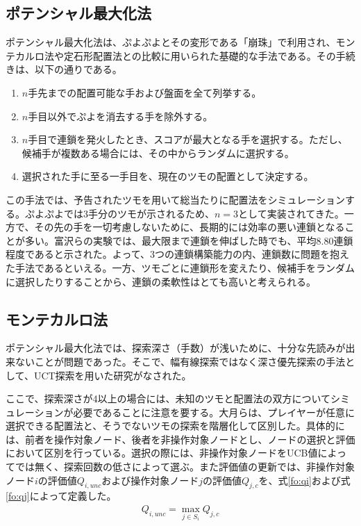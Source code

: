 \documentclass[12pt]{jsarticle}
\begin{document}
\subsection{ポテンシャル最大化法}
ポテンシャル最大化法は、ぷよぷよとその変形である「崩珠」で利用され、モンテカルロ法や定石形配置法との比較に用いられた基礎的な手法である\cite{puyo_monte, puyo_temp}。その手続きは、以下の通りである。
\begin{enumerate}
\item $n$手先までの配置可能な手および盤面を全て列挙する。
\item $n$手目以外でぷよを消去する手を除外する。
\item $n$手目で連鎖を発火したとき、スコアが最大となる手を選択する。ただし、候補手が複数ある場合には、その中からランダムに選択する。
\item 選択された手に至る一手目を、現在のツモの配置として決定する。
\end{enumerate}

この手法では、予告されたツモを用いて総当たりに配置法をシミュレーションする。ぷよぷよでは3手分のツモが示されるため、$n=3$として実装されてきた。一方で、その先の手を一切考慮しないために、長期的には効率の悪い連鎖となることが多い。富沢ら\cite{puyo_temp}の実験では、最大限まで連鎖を伸ばした時でも、平均8.80連鎖程度であると示された。よって、3つの連鎖構築能力の内、連鎖数に問題を抱えた手法であるといえる。一方、ツモごとに連鎖形を変えたり、候補手をランダムに選択したりすることから、連鎖の柔軟性はとても高いと考えられる。

\subsection{モンテカルロ法}
ポテンシャル最大化法では、探索深さ（手数）が浅いために、十分な先読みが出来ないことが問題であった。そこで、幅有線探索ではなく深さ優先探索の手法として、UCT探索を用いた研究がなされた\cite{puyo_monte}。

ここで、探索深さが4以上の場合には、未知のツモと配置法の双方についてシミュレーションが必要であることに注意を要する。大月らは、プレイヤーが任意に選択できる配置法と、そうでないツモの探索を階層化して区別した。具体的には、前者を操作対象ノード、後者を非操作対象ノードとし、ノードの選択と評価において区別を行っている。選択の際には、非操作対象ノードをUCB値によってでは無く、探索回数の低さによって選ぶ。また評価値の更新では、非操作対象ノード$i$の評価値$Q_{i,unc}$および操作対象ノード$j$の評価値$Q_{j,c}$を、式\ref{fo:qi}および式\ref{fo:qj}によって定義した。
\begin{eqnarray} \label{fo:qi}
  Q_{i,unc} = \max_{j\in S_i}Q_{j,c}
\end{eqnarray}
\end{document}
